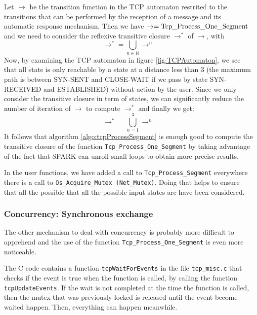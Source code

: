 \documentclass[a4paper, 10pt]{article}
\begin{document}
    Let $\rightarrow$ be the transition function in the TCP automaton restrited to the transitions
    that can be performed by the reception of a message and its automatic response mechanism.
    Then we have $\rightarrow = \text{\lstinline[language=Ada]{Tcp_Process_One_Segment}}$ and
    we need to consider the reflexive transitive closure $\rightarrow^*$ of $\rightarrow$, with
    \[\rightarrow^* = \bigcup_{n\in\mathbb{N}} \rightarrow^n\]
    Now, by examining the TCP automaton in figure \ref{fig:TCPAutomaton}, we see that all state is
    only reachable by a state at a distance less than 3 (the maximum path is between SYN-SENT and
    CLOSE-WAIT if we pass by state SYN-RECEIVED and ESTABLISHED) without action by the user. Since
    we only consider the transitive closure in term of states, we can significantly reduce the number
    of iteration of $\rightarrow$ to compute $\rightarrow^*$ and finally we get:
    \[\rightarrow^* = \bigcup_{n=1}^3 \rightarrow^n\]
    It follows that algorithm \ref{algo:tcpProcessSegment} is enough good to compute the transitive closure of the function
    \lstinline[language=Ada]{Tcp_Process_One_Segment} by taking advantage of the fact that SPARK can unroll
    small loops to obtain more precise results.

    In the user functions, we have added a call to \lstinline[language=Ada]{Tcp_Process_Segment} everywhere
    there is a call to \lstinline{Os_Acquire_Mutex (Net_Mutex)}. Doing that helps to ensure that all the
    possible that all the possible input states are have been considered.

    \subsubsection{Concurrency: Synchronous exchange}

    The other mechanism to deal with concurrency is probably more difficult to apprehend and the
    use of the function \lstinline[language=Ada]{Tcp_Process_One_Segment} is even more noticeable.
    
    The C code contains a function \lstinline[language=C]{tcpWaitForEvents} in the file \texttt{tcp\_misc.c}
    that checks if the event is true when the function is called, by calling the function
    \lstinline[language=C]{tcpUpdateEvents}. If the wait is not completed at the time the function is
    called, then the mutex that was previously locked is released until the event become waited happen.
    Then, everything can happen meanwhile.
    
\end{document}
